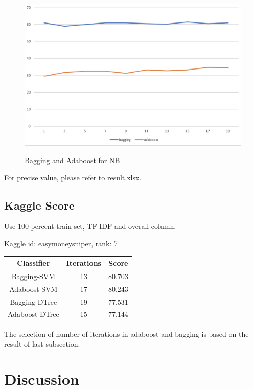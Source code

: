 \documentclass[paper=a4, fontsize=11pt, UTF8]{article} %
\begin{document}
\begin{figure}[H]
	\centering
	\includegraphics[scale=0.5]{./photos/nb.png}
    \label{nb}
    \caption{Bagging and Adaboost for NB}
\end{figure}

For precise value, please refer to result.xlsx.

\subsection{Kaggle Score}
Use 100 percent train set, TF-IDF and overall column.

Kaggle id: easymoneysniper, rank: 7
\begin{center}
    \begin{tabular}{c|c|c}
        \hline
        Classifier & Iterations & Score\\
        \hline
        Bagging-SVM & 13 & 80.703\\
        \hline
        Adaboost-SVM & 17 & 80.243\\
        \hline
        Bagging-DTree & 19 & 77.531\\
        \hline
        Adaboost-DTree & 15 & 77.144\\
        \hline
    \end{tabular}
\end{center}
The selection of number of iterations in adaboost and bagging is based on the result of last subsection. 

\section{Discussion}
\end{document}
